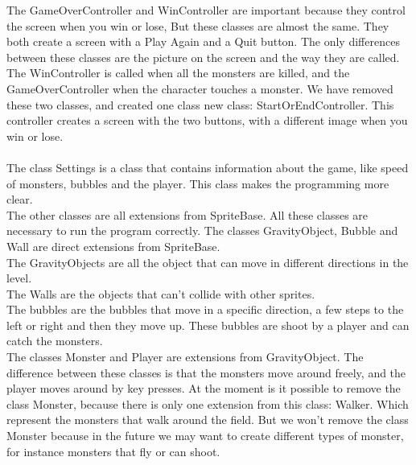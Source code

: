 The GameOverController and WinController are important because they control the screen when you win or lose, But these classes are almost the same. They both create a screen with a Play Again and a Quit button. The only differences between these classes are the picture on the screen and the way they are called. The WinController is called when all the monsters are killed, and the GameOverController when the character touches a monster. We have removed these two classes, and created one class new class: StartOrEndController. This controller creates a screen with the two buttons, with a different image when you win or lose.\\
\\
The class Settings is a class that contains information about the game, like speed of monsters, bubbles and the player. This class makes the programming more clear.
\\
The other classes are all extensions from SpriteBase. All these classes are necessary to run the program correctly. The classes GravityObject, Bubble and Wall are direct extensions from SpriteBase.\\
The GravityObjects are all the object that can move in different directions in the level.\\
The Walls are the objects that can't collide with other sprites.\\
The bubbles are the bubbles that move in a specific direction, a few steps to the left or right and then they move up. These bubbles are shoot by a player and can catch the monsters.\\
The classes Monster and Player are extensions from GravityObject. The difference between these classes is that the monsters move around freely, and the player moves around by key presses. At the moment is it possible to remove the class Monster, because there is only one extension from this class: Walker. Which represent the monsters that walk around the field. But we won't remove the class Monster because in the future we may want to create different types of monster, for instance monsters that fly or can shoot.